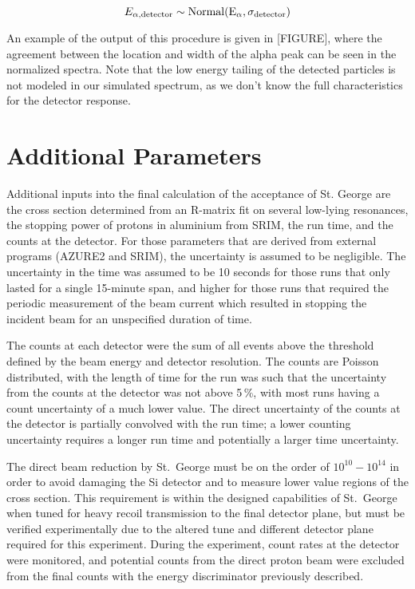 \begin{equation}
    E_{\alpha,\rm{detector}} \sim \rm{Normal}(E_{\alpha},\sigma_{\rm detector})
\end{equation}

An example of the output of this procedure is given in {[}FIGURE{]},
where the agreement between the location and width of the alpha peak can
be seen in the normalized spectra. Note that the low energy tailing of
the detected particles is not modeled in our simulated spectrum, as we
don't know the full characteristics for the detector response.


\section{Additional Parameters}
\label{sec:additional-parameters}

Additional inputs into the final calculation of the acceptance of St.
George are the cross section determined from an R-matrix fit on several
low-lying resonances, the stopping power of protons in aluminium from
SRIM, the run time, and the counts at the detector. For those parameters
that are derived from external programs (AZURE2 and SRIM), the
uncertainty is assumed to be negligible. The uncertainty in the time was
assumed to be 10 seconds for those runs that only lasted for a single
15-minute span, and higher for those runs that required the periodic
measurement of the beam current which resulted in stopping the incident
beam for an unspecified duration of time.

The counts at each detector were the sum of all events above the
threshold defined by the beam energy and detector resolution. The counts
are Poisson distributed, with the length of time for the run was such
that the uncertainty from the counts at the detector was not above 5\,\%,
with most runs having a count uncertainty of a much lower value. The
direct uncertainty of the counts at the detector is partially convolved
with the run time; a lower counting uncertainty requires a longer run
time and potentially a larger time uncertainty.

The direct beam reduction by St.\ George must be on the order of
$10^{10}-10^{14}$ in order to avoid damaging the Si detector and to
measure lower value regions of the cross section. This requirement is
within the designed capabilities of St.\ George when tuned for heavy
recoil transmission to the final detector plane, but must be verified
experimentally due to the altered tune and different detector plane
required for this experiment. During the experiment, count rates at the
detector were monitored, and potential counts from the direct proton
beam were excluded from the final counts with the energy discriminator
previously described.

